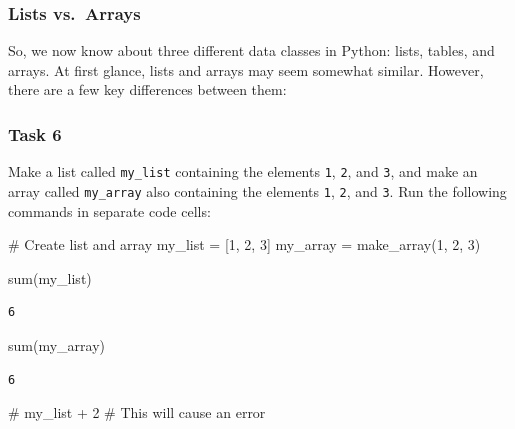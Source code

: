 \documentclass[
  11pt,
]{article}
\newenvironment{Shaded}{\begin{snugshade}}{\end{snugshade}}
\newcommand{\BuiltInTok}[1]{\textcolor[rgb]{0.00,0.23,0.31}{#1}}
\newcommand{\CommentTok}[1]{\textcolor[rgb]{0.37,0.37,0.37}{#1}}
\newcommand{\DecValTok}[1]{\textcolor[rgb]{0.68,0.00,0.00}{#1}}
\newcommand{\NormalTok}[1]{\textcolor[rgb]{0.00,0.23,0.31}{#1}}
\newcommand{\OperatorTok}[1]{\textcolor[rgb]{0.37,0.37,0.37}{#1}}
\begin{document}
\subsubsection{Lists vs.~Arrays}\label{lists-vs.-arrays}

So, we now know about three different data classes in Python: lists,
tables, and arrays. At first glance, lists and arrays may seem somewhat
similar. However, there are a few key differences between them:

\subsubsection{Task 6}\label{task-6}

Make a list called \texttt{my\_list} containing the elements \texttt{1},
\texttt{2}, and \texttt{3}, and make an array called \texttt{my\_array}
also containing the elements \texttt{1}, \texttt{2}, and \texttt{3}. Run
the following commands in separate code cells:

\begin{Shaded}
\begin{Highlighting}[]
\CommentTok{\# Create list and array}
\NormalTok{my\_list }\OperatorTok{=}\NormalTok{ [}\DecValTok{1}\NormalTok{, }\DecValTok{2}\NormalTok{, }\DecValTok{3}\NormalTok{]}
\NormalTok{my\_array }\OperatorTok{=}\NormalTok{ make\_array(}\DecValTok{1}\NormalTok{, }\DecValTok{2}\NormalTok{, }\DecValTok{3}\NormalTok{)}
\end{Highlighting}
\end{Shaded}

\begin{Shaded}
\begin{Highlighting}[]
\BuiltInTok{sum}\NormalTok{(my\_list)}
\end{Highlighting}
\end{Shaded}

\begin{verbatim}
6
\end{verbatim}

\begin{Shaded}
\begin{Highlighting}[]
\BuiltInTok{sum}\NormalTok{(my\_array)}
\end{Highlighting}
\end{Shaded}

\begin{verbatim}
6
\end{verbatim}

\begin{Shaded}
\begin{Highlighting}[]
\CommentTok{\# my\_list + 2  \# This will cause an error}
\end{Highlighting}
\end{Shaded}
\end{document}
